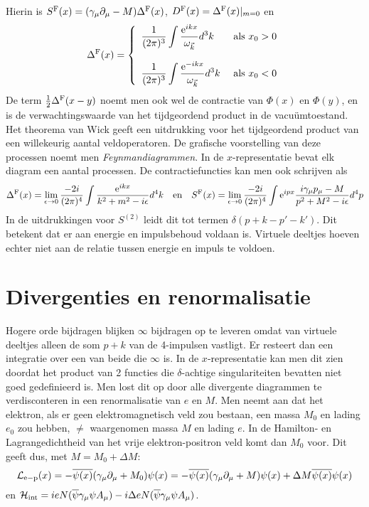 Hierin is $S^{\rm F}(x)=(\gamma_\mu\partial_\mu-M)\Delta^{\rm F}(x)$,
$D^{\rm F}(x)=\Delta^{\rm F}(x)|_{m=0}$ en
\[
\Delta^{\rm F}(x)=\left\{\begin{array}{ll}
\displaystyle\frac{1}{(2\pi)^3}\int\frac{{\rm e}^{ikx}}{\omega_{\vec{k}}}d^3k&~\mbox{als}~x_0>0\\
\\
\displaystyle\frac{1}{(2\pi)^3}\int\frac{{\rm e}^{-ikx}}{\omega_{\vec{k}}}d^3k&~\mbox{als}~x_0<0
\end{array}\right.
\]
De term $\mbox{$\frac{1}{2}$}\Delta^{\rm F}(x-y)$ noemt men ook wel de contractie van
$\Phi(x)$ en $\Phi(y)$, en is de verwachtingswaarde van het tijdgeordend
product in de vacu\"umtoestand. Het theorema van Wick geeft een uitdrukking
voor het tijdgeordend product van een willekeurig aantal veldoperatoren. De
grafische voorstelling van deze processen noemt men {\it Feynmandiagrammen}.
In de $x$-representatie bevat elk diagram een aantal processen. De
contractiefuncties kan men ook schrijven als
\[
\Delta^{\rm F}(x)=\lim_{\epsilon\rightarrow0}\frac{-2i}{(2\pi)^4}
\int\frac{{\rm e}^{ikx}}{k^2+m^2-i\epsilon}d^4k
~~~\mbox{en}~~~
S^{\rm F}(x)=\lim_{\epsilon\rightarrow0}\frac{-2i}{(2\pi)^4}
\int{\rm e}^{ipx}\frac{i\gamma_\mu p_\mu-M}{p^2+M^2-i\epsilon}d^4p
\]
In de uitdrukkingen voor $S^{(2)}$ leidt dit tot termen $\delta(p+k-p'-k')$.
Dit betekent dat er aan energie en impulsbehoud voldaan is. Virtuele
deeltjes hoeven echter niet aan de relatie tussen energie en impuls te
voldoen.

\section[~~Divergenties en renormalisatie]{Divergenties en renormalisatie}
Hogere orde bijdragen blijken $\infty$ bijdragen op te leveren omdat van
virtuele deeltjes alleen de som $p+k$ van de 4-impulsen vastligt. Er resteert
dan een integratie over een van beide die $\infty$ is. In de $x$-representatie
kan men dit zien doordat het product van 2 functies die $\delta$-achtige
singulariteiten bevatten niet goed gedefinieerd is. Men lost dit op door
alle divergente diagrammen te verdisconteren in een renormalisatie van $e$
en $M$. Men neemt aan dat het elektron, als er geen elektromagnetisch veld
zou bestaan, een massa $M_0$ en lading $e_0$ zou hebben, $\neq$ waargenomen
massa $M$ en lading $e$. In de Hamilton- en Lagrangedichtheid van het vrije
elektron-positron veld komt dan $M_0$ voor. Dit geeft dus, met $M=M_0+\Delta M$:
\[
{\cal L}_{\rm e-p}(x)=-\overline{\psi(x)}(\gamma_\mu\partial_\mu+M_0)\psi(x)=
-\overline{\psi(x)}(\gamma_\mu\partial_\mu+M)\psi(x)+\Delta M\overline{\psi(x)}\psi(x)
\]
en ${\cal H}_{\rm int}=ieN(\overline{\psi}\gamma_\mu\psi A_\mu)-i\Delta eN(\overline{\psi}\gamma_\mu\psi A_\mu)$.

